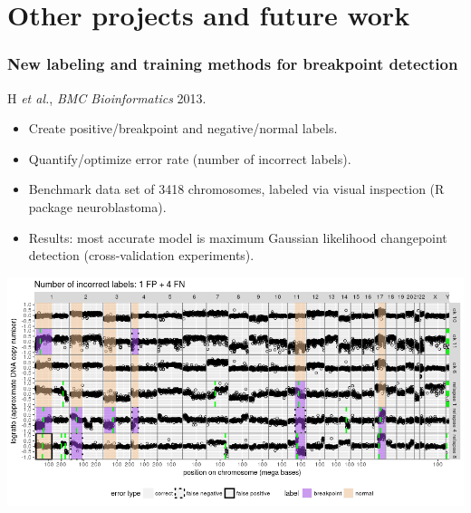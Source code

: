\documentclass{beamer}
\newcommand{\algo}[1]{\textcolor{#1}{#1}}
\begin{document}
\section{Other projects and future work}

\begin{frame}
  \frametitle{New labeling and training methods for breakpoint detection}

  H {\it et al.}, {\it BMC Bioinformatics} 2013.
  \begin{itemize}
  \item Create positive/breakpoint and negative/normal labels.
  \item Quantify/optimize error rate (number of incorrect labels).
  \item Benchmark data set of 3418 chromosomes,
    labeled via visual inspection (R package neuroblastoma).
  \item Results: most accurate model is maximum Gaussian likelihood 
    changepoint detection (cross-validation experiments).
  \end{itemize}

  \includegraphics[width=\textwidth]{neuroblastoma-ok-relapse-supervised}

\end{frame} 



\end{document}
